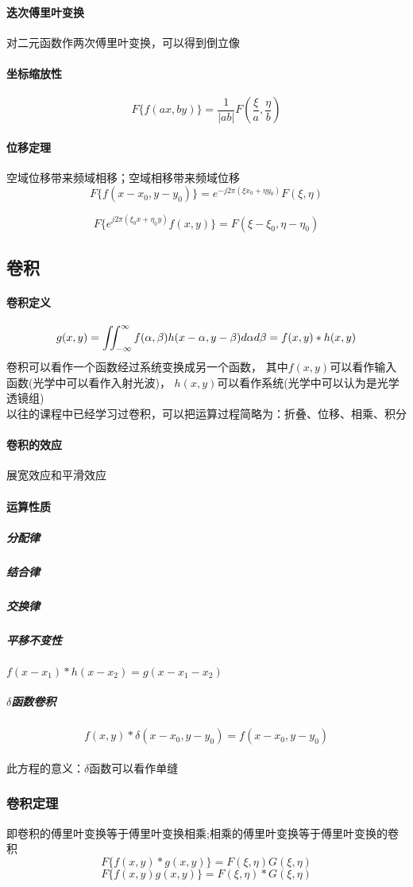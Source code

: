 \documentclass[UTF8]{ctexart}
\newcommand{\f}[2]{\frac{#1}{#2}}%
\begin{document}
\paragraph{迭次傅里叶变换}
对二元函数作两次傅里叶变换，可以得到倒立像
\paragraph{坐标缩放性}
\[
F\{f(ax,by)\} =\f{1}{|ab|}F(\f{\xi}{a},\f{\eta}{b})   
\]
\paragraph{位移定理}空域位移带来频域相移；空域相移带来频域位移\[
F\{f(x-x_{0},y-y_{0})\}=e^{-j2\pi(\xi x_{0}+\eta y_{0})}F(\xi,\eta)    
\]

\[F\{e^{j2\pi(\xi_{0}x+\eta_{0}y)} f(x,y)\}=F(\xi-\xi_{0},\eta-\eta_{0})\]
\subsection{卷积}
\paragraph{卷积定义}\[g(x,y)=\iint_{-\infty}^{\infty}f(\alpha,\beta)h(x-\alpha,y-\beta)d\alpha d\beta \\
=f(x,y)*h(x,y)
\]
卷积可以看作一个函数经过系统变换成另一个函数，
其中$f(x,y)$可以看作输入函数(光学中可以看作入射光波)，
$h(x,y)$可以看作系统(光学中可以认为是光学透镜组)
\\以往的课程中已经学习过卷积，可以把运算过程简略为：折叠、位移、相乘、积分
\paragraph{卷积的效应}展宽效应和平滑效应
\paragraph{运算性质}
\subparagraph{分配律}
\subparagraph{结合律}
\subparagraph{交换律}
\subparagraph{平移不变性}$f(x-x_{1})*h(x-x_{2})=g(x-x_{1}-x_{2})$
\subparagraph{$\delta$函数卷积}
\[f(x,y)*\delta(x-x_{0},y-y_{0})=f(x-x_{0},y-y_{0})\]
\\此方程的意义：$\delta$函数可以看作单缝
\subsubsection{卷积定理}即卷积的傅里叶变换等于傅里叶变换相乘;相乘的傅里叶变换等于傅里叶变换的卷积\[
    F\{f(x,y)*g(x,y)\}=F(\xi,\eta)G(\xi,\eta)
    \]
    \[
        F\{f(x,y)g(x,y)\}=F(\xi,\eta)*G(\xi,\eta)
        \]
\end{document}
